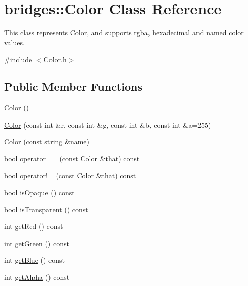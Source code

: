 \hypertarget{classbridges_1_1_color}{}\section{bridges\+:\+:Color Class Reference}
\label{classbridges_1_1_color}


This class represents \hyperlink{classbridges_1_1_color}{Color}, and supports rgba, hexadecimal and named color values.  




{\ttfamily \#include $<$Color.\+h$>$}

\subsection*{Public Member Functions}
\begin{DoxyCompactItemize}
\item 
\hyperlink{classbridges_1_1_color_ab89df8fea283d33585380ea91d78bbee}{Color} ()
\item 
\hyperlink{classbridges_1_1_color_aa861c0dc7729008cc4f886f235198181}{Color} (const int \&r, const int \&g, const int \&b, const int \&a=255)
\item 
\hyperlink{classbridges_1_1_color_a813c6cb59aad0883bcc12305fa6049cc}{Color} (const string \&name)
\item 
bool \hyperlink{classbridges_1_1_color_ab8cf6a7a8a786e2145c9d814f719aa9c}{operator==} (const \hyperlink{classbridges_1_1_color}{Color} \&that) const 
\item 
bool \hyperlink{classbridges_1_1_color_a9d0c6d7f2fc3d875b6af38c0e90d2c4f}{operator!=} (const \hyperlink{classbridges_1_1_color}{Color} \&that) const 
\item 
bool \hyperlink{classbridges_1_1_color_aed2780b4954dccd7a243ee956522f132}{is\+Opaque} () const 
\item 
bool \hyperlink{classbridges_1_1_color_a7575f11baf808823ea5c8e68b5b71a45}{is\+Transparent} () const 
\item 
int \hyperlink{classbridges_1_1_color_a50d72a73bf683426437b6c4dbb7e080b}{get\+Red} () const 
\item 
int \hyperlink{classbridges_1_1_color_a7ee04a0a4a4788d0a8671fb5d46cb4f8}{get\+Green} () const 
\item 
int \hyperlink{classbridges_1_1_color_ad623a08fcd93b60831bdc80acbc30cb6}{get\+Blue} () const 
\item 
int \hyperlink{classbridges_1_1_color_a144062e54bb7f39eca05f0bc2cc66ba3}{get\+Alpha} () const 

\end{DoxyCompactItemize}
